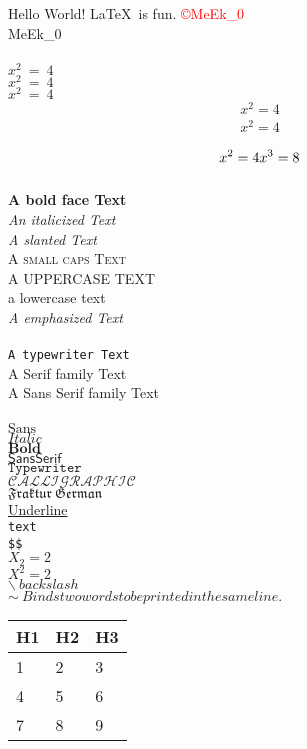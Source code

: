 \documentclass[a4paper, 10pt]{article}
\begin{document}
Hello World!
\LaTeX \ is fun.
\textcolor{red}{\copyright MeEk\_0}
\\
MeEk\_0     %
\\\\      %
$x^2 \ =\ 4$ \\
{\color{red} $x^2 \ =\ 4$} \\
{\color{blue} $x^2 \ =\ 4$} \\

\begin{align}
	\mathit{x^2 = 4} \\
	\mathit{x^2 = 4}
\end{align}

\begin{equation}
	x^2 = 4	\\
	x^3 = 8
\end{equation}
\\
\textbf{A bold face Text} \\
\textit{An italicized Text} \\
\textsl{A slanted Text} \\
\textsc{A small caps Text} \\
\uppercase{A uppercase Text} \\
\lowercase{A LOwERCASe TexT} \\
\emph{A emphasized Text} \\
\\
\texttt{A typewriter Text} \\
\textrm{A Serif family Text} \\
\textsf{A Sans Serif family Text} \\
\\
$\mathrm{Sans}$ \\
$\mathit{Italic}$ \\
$\mathbf{Bold}$ \\
$\mathsf{Sans Serif}$ \\
$\mathtt{Typewriter}$ \\
$\mathcal{CALLIGRAPHIC}$ \\
$\mathfrak{Fraktur \ German}$ \\

\underline{Underline} \\
\verb|text| \\
\verb "$$"\\
$X_2 = 2$ \\  		%
$X^2 = 2$ \\   		%
$\backslash \ backslash $   \\
$\sim \ Binds two words to be printed in the same line. $ 	\\

\begin{table}[h]		%
	\begin{tabularx}{5cm}{|X|X|X|}
		\hline      %
		H1 & H2 & H3 \\
		\hline
		1  & 2  & 3  \\
		4  & 5  & 6  \\
		7  & 8  & 9  \\
		\hline
	\end{tabularx}
\end{table}
\end{document}
